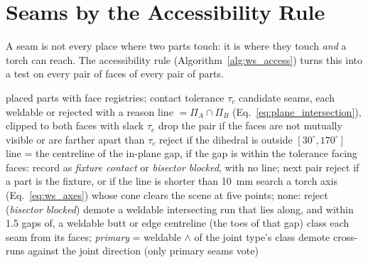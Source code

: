 \section{Seams by the Accessibility Rule}
\label{sec:ws_d4}
A seam is not every place where two parts touch: it is where they touch \emph{and} a torch
can reach. The accessibility rule (Algorithm~\ref{alg:ws_access}) turns this into a test on
every pair of faces of every pair of parts.

\begin{algorithm}[htbp]
\caption{The accessibility rule (plate joints)}
\label{alg:ws_access}
\begin{algorithmic}[1]
\REQUIRE placed parts with face registries; contact tolerance $\tau_c$
\ENSURE candidate seams, each weldable or rejected with a reason
    \STATE line $=\Pi_A\cap\Pi_B$ (Eq.~\ref{eq:plane_intersection}), clipped to both faces with slack $\tau_c$
    \STATE drop the pair if the faces are not mutually visible or are farther apart than $\tau_c$
    \STATE reject if the dihedral is outside $[30^\circ,170^\circ]$
    \STATE line = the centreline of the in-plane gap, if the gap is within the tolerance
  \ELSE
    \STATE facing faces: record as \emph{fixture contact} or \emph{bisector blocked}, with no line; next pair
  \ENDIF
  \STATE reject if a part is the fixture, or if the line is shorter than 10~mm
  \STATE search a torch axis (Eq.~\ref{eq:ws_axes}) whose cone clears the scene at five points; none: reject (\emph{bisector blocked})
\ENDFOR
\STATE demote a weldable intersecting run that lies along, and within 1.5 gaps of, a weldable butt or edge centreline (the toes of that gap)
\STATE class each seam from its faces; \emph{primary} = weldable $\wedge$ of the joint type's class
\STATE demote cross-runs against the joint direction (only primary seams vote)
\end{algorithmic}
\end{algorithm}


